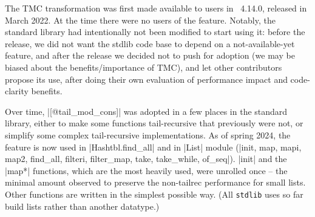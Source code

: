 
The TMC transformation was first made available to users in \OCaml~4.14.0, released in March 2022.
At the time there were no users of the feature.
Notably, the \OCaml standard library had intentionally not been modified to start using it: before the release, we did not want the stdlib code base to depend on a not-available-yet feature, and after the release we decided not to push for adoption (we may be biased about the benefits/importance of TMC), and let other contributors propose its use, after doing their own evaluation of performance impact and code-clarity benefits.

Over time, \ocaml|[@tail_mod_cons]| was adopted in a few places in the \OCaml standard library, either to make some functions tail-recursive that previously were not, or simplify some complex tail-recursive implementations. As of spring 2024, the feature is now used in \ocaml|Hashtbl.find_all| and in \ocaml|List| module (\ocaml|init, map, mapi, map2, find_all, filteri, filter_map, take, take_while, of_seq|). \ocaml|init| and the \ocaml|map*| functions, which are the most heavily used, were unrolled once -- the minimal amount observed to preserve the non-tailrec performance for small lists. Other functions are written in the simplest possible way. (All \texttt{stdlib} uses so far build lists rather than another datatype.)

